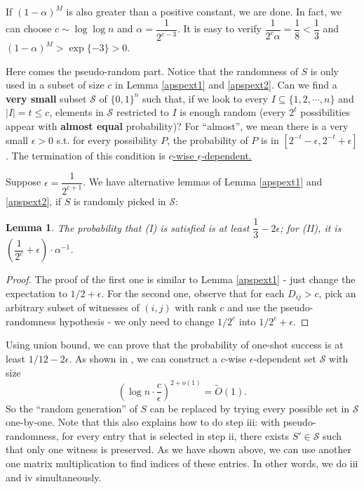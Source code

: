 \documentclass[11pt]{article}
\theoremstyle{plain}
\newtheorem{lemma}{Lemma}[section]
\begin{document}
If $(1-\alpha)^M$ is also greater than a positive constant, we are done. In fact, we can choose $c\sim\log \log n$ and $\alpha=\dfrac{1}{2^{c-3}}$. It is easy to verify $\dfrac{1}{2^c\alpha}=\dfrac{1}{8}<\dfrac{1}{3}$ and $(1-\alpha)^M>\exp\{-3\}>0$.

Here comes the pseudo-random part. Notice that the randomness of $S$ is only used in a subset of size $c$ in Lemma \ref{apspext1} and \ref{apspext2}. Can we find a \textbf{very small} subset $\mathcal{S}$ of $\{0,1\}^n$ such that, if we look to every $I\subseteq\{1,2,\cdots,n\}$ and $|I|=t\le c$, elements in $\mathcal{S}$ restricted to $I$ is enough random (every $2^t$ possibilities appear with \textbf{almost equal} probability)? For ``almost'', we mean there is a very small $\epsilon>0$ s.t. for every possibility $P$, the probability of $P$ is in $[2^{-t}-\epsilon,2^{-t}+\epsilon]$. The termination of this condition is \underline{$c$-wise $\epsilon$-dependent.}

Suppose $\epsilon=\dfrac{1}{2^{c+1}}$. We have alternative lemmas of Lemma \ref{apspext1} and \ref{apspext2}, if $S$ is randomly picked in $\mathcal{S}$:

\begin{lemma}
\label{apspext4}
The probability that (I) is satisfied is at least $\dfrac{1}{3}-2\epsilon$; for (II), it is $(\dfrac{1}{2^c}+\epsilon)\cdot \alpha^{-1}$.
\end{lemma}

\begin{proof}
The proof of the first one is similar to Lemma \ref{apspext1} - just change the expectation to $1/2+\epsilon$. For the second one, observe that for each $D_{ij}>c$, pick an arbitrary subset of witnesses of $(i,j)$ with rank $c$ and use the pseudo-randomness hypothesis - we only need to change $1/2^c$ into $1/2^c+\epsilon$.
\end{proof}

Using union bound, we can prove that the probability of one-shot success is at least $1/12-2\epsilon$. As shown in \cite{10.1145/100216.100244}, we can construct a $c$-wise $\epsilon$-dependent set $\mathcal{S}$ with size
$$(\log n\cdot\dfrac{c}{\epsilon})^{2+o(1)}=\tilde O(1).$$
So the ``random generation'' of $S$ can be replaced by trying every possible set in $\mathcal{S}$ one-by-one. Note that this also explains how to do step iii: with pseudo-randomness, for every entry that is selected in step ii, there exists $S'\in \mathcal{S}$ such that only one witness is preserved. As we have shown above, we can use another one matrix multiplication to find indices of these entries. In other words, we do iii and iv simultaneously.
\end{document}
